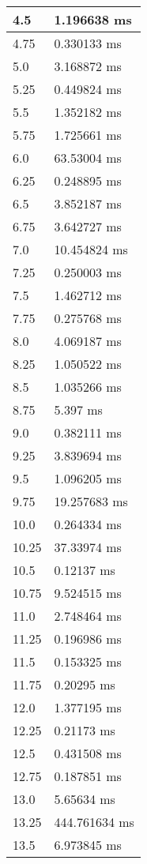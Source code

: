 \begin{multicols}{2}
\begin{tabular}{|l|l|}
		4.5 & 1.196638 ms \\ \hline
		4.75 & 0.330133 ms \\ \hline
		5.0 & 3.168872 ms \\ \hline
		5.25 & 0.449824 ms \\ \hline
		5.5 & 1.352182 ms \\ \hline
		5.75 & 1.725661 ms \\ \hline
		6.0 & 63.53004 ms \\ \hline
		6.25 & 0.248895 ms \\ \hline
		6.5 & 3.852187 ms \\ \hline
		6.75 & 3.642727 ms \\ \hline
		7.0 & 10.454824 ms \\ \hline
		7.25 & 0.250003 ms \\ \hline
		7.5 & 1.462712 ms \\ \hline
		7.75 & 0.275768 ms \\ \hline
		8.0 & 4.069187 ms \\ \hline
		8.25 & 1.050522 ms \\ \hline
		8.5 & 1.035266 ms \\ \hline
		8.75 & 5.397 ms \\ \hline
		9.0 & 0.382111 ms \\ \hline
		9.25 & 3.839694 ms \\ \hline
		9.5 & 1.096205 ms \\ \hline
		9.75 & 19.257683 ms \\ \hline
		10.0 & 0.264334 ms \\ \hline
		10.25 & 37.33974 ms \\ \hline
		10.5 & 0.12137 ms \\ \hline
		10.75 & 9.524515 ms \\ \hline
		11.0 & 2.748464 ms \\ \hline
		11.25 & 0.196986 ms \\ \hline
		11.5 & 0.153325 ms \\ \hline
		11.75 & 0.20295 ms \\ \hline
		12.0 & 1.377195 ms \\ \hline
		12.25 & 0.21173 ms \\ \hline
		12.5 & 0.431508 ms \\ \hline
		12.75 & 0.187851 ms \\ \hline
		13.0 & 5.65634 ms \\ \hline
		13.25 & 444.761634 ms \\ \hline
		13.5 & 6.973845 ms \\ \hline

\end{tabular}
\end{multicols}
